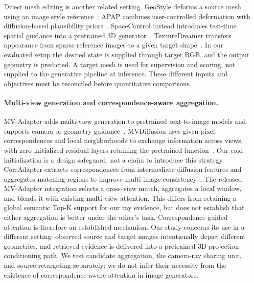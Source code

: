 Direct mesh editing is another related setting. GeoStyle deforms a source
mesh using an image style reference~\cite{choi2026geostyle}; APAP combines
user-controlled deformation with diffusion-based plausibility
priors~\cite{yoo2024apap}. SpaceControl instead introduces test-time spatial
guidance into a pretrained 3D generator~\cite{fedele2025spacecontrol}.
TextureDreamer transfers appearance from sparse reference images to a given
target shape~\cite{yeh2024texturedreamer}. In our evaluated setup the desired
state is supplied through target RGB, and the output geometry is predicted.
A target mesh is used for supervision and scoring, not supplied to the
generative pipeline at inference. These different inputs and objectives
must be reconciled before quantitative comparisons.

\paragraph{Multi-view generation and correspondence-aware aggregation.}
MV-Adapter adds multi-view generation to pretrained text-to-image models and
supports camera or geometry guidance~\cite{huang2025mvadapter}.
MVDiffusion uses given pixel correspondences and local neighborhoods to exchange
information across views, with zero-initialized residual layers retaining the
pretrained function~\cite{tang2023mvdiffusion}. Our cold initialization is a
design safeguard, not a claim to introduce this strategy. CorrAdapter extracts correspondences from
intermediate diffusion features and aggregates matching regions to improve
multi-image consistency~\cite{zhang2026corradapter}.
The released MV-Adapter integration selects a cross-view match, aggregates a
local window, and blends it with existing multi-view attention. This differs
from retaining a global semantic Top-K support for our ray evidence, but does
not establish that either aggregation is better under the other's task.
Correspondence-guided attention is therefore an established mechanism.
Our study concerns its use in a different setting: observed source and target
images intentionally depict different geometries, and retrieved evidence is
delivered into a pretrained 3D projection-conditioning path. We test candidate
aggregation, the camera-ray sharing unit, and source retargeting separately;
we do not infer their necessity from the existence of correspondence-aware
attention in image generators.

